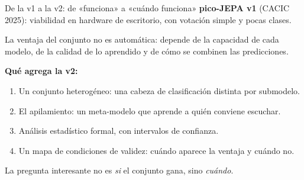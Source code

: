 \documentclass[aspectratio=169,10pt]{beamer}
\begin{document}
\begin{frame}{De la v1 a la v2: de «funciona» a «cuándo funciona»}
  \small
  \textbf{pico-JEPA v1} (CACIC 2025): viabilidad en hardware de escritorio,
  con votación simple y pocas clases.

  \medskip
  La ventaja del conjunto \alert{no es automática}: depende de la capacidad
  de cada modelo, de la calidad de lo aprendido y de cómo se combinen las
  predicciones.

  \medskip
  \textbf{Qué agrega la v2:}
  \begin{enumerate}
    \item Un conjunto \alert{heterogéneo}: una cabeza de clasificación
          distinta por submodelo.
    \item El \alert{apilamiento}: un meta-modelo que aprende a quién
          conviene escuchar.
    \item Análisis estadístico formal, con intervalos de confianza.
    \item Un \alert{mapa de condiciones de validez}: cuándo aparece la
          ventaja y cuándo no.
  \end{enumerate}

  \vfill
  \begin{block}{}
    La pregunta interesante no es \emph{si} el conjunto gana, sino
    \emph{cuándo}.
  \end{block}
\end{frame}
\end{document}
